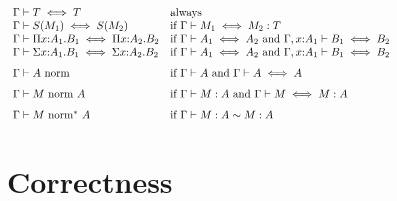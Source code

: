 \documentclass{article}
\theoremstyle{break}
\begin{document}
\[\begin{array}{lp{4.2truein}}
\akindequiv{\context}{\ktype}{\ktype}&always\\
\akindequiv{\context}{\ksingleton{\constructor_1}}
   {\ksingleton{\constructor_2}}&
  if $\aconequiv{\context}{\constructor_1}{\constructor_2}{\ktype}$\\
\akindequiv{\context}{\kpi{\cvar}{\kind_1}{\otherkind_1}} 
   {\kpi{\cvar}{\kind_2}{\otherkind_2}}&
  if $\akindequiv{\context}{\kind_1}{\kind_2}$ and
  $\akindequiv{\context,\cvar{:}\kind_1}{\otherkind_1}{\otherkind_2}$\\
\akindequiv{\context}{\ksigma{\cvar}{\kind_1}{\otherkind_1}} 
   {\ksigma{\cvar}{\kind_2}{\otherkind_2}}&
  if $\akindequiv{\context}{\kind_1}{\kind_2}$ and
  $\akindequiv{\context,\cvar{:}\kind_1}{\otherkind_1}{\otherkind_2}$\\[7pt]

\normtype{\context}{\kind}&
  if $\validkind{\context}{\kind}$ and 
  $\akindequiv{\context}{\kind}{\kind}$\\[7pt]

\normterm{\context}{\constructor}{\kind}&
  if $\validconstructor{\context}{\constructor}{\kind}$ and
  $\aconequiv{\context}{\constructor}{\constructor}{\kind}$\\[7pt]

\normE{\context}{\constructor}{\kind}&
  if $\weakconequiv{\context}{\constructor}{\kind}{\constructor}{\kind}$\\
\end{array}
\]

\section{Correctness}

\newcommand{\semanticvalidtype}[2]{{#2}\mathrm{\ type\ }[#1]}
\newcommand{\semanticequivtype}[3]{{#2}\mathrm{\ is\ }{#3}\ [#1]}
\newcommand{\semanticsubtype}[3]{{#2}\mathrm{\ sub\ }{#3}\ [#1]}
\newcommand{\semanticvalidterm}[3]{{#2}\mathrm{\ in\ }{#3}\ [#1]}
\newcommand{\semanticequivterm}[4]{{#2}\mathrm{\ is\ }{#3}\mathrm{\ in\ }{#4}\ [#1]}
\newcommand{\semanticcontext}[1]{{#1}\,\mbox{ctxt}}
\newcommand{\world}{\Delta}
\newcommand{\algorithmicequivterm}[4]{#1\vdash #2 \iff #3 : #4}
\newcommand{\algorithmicequivtype}[3]{#1\vdash #2 \iff #3}
\newcommand{\algorithmicwhnf}{\headnormsto}
\newcommand{\semanticequivenv}[4]{{#2}\mathrm{\ is\ }{#3}\mathrm{\ in\ }{#4}\ [#1]}
\newcommand{\semanticvalidenv}[3]{{#2}\mathrm{\ in\ }{#3}\ [#1]}
\end{document}
